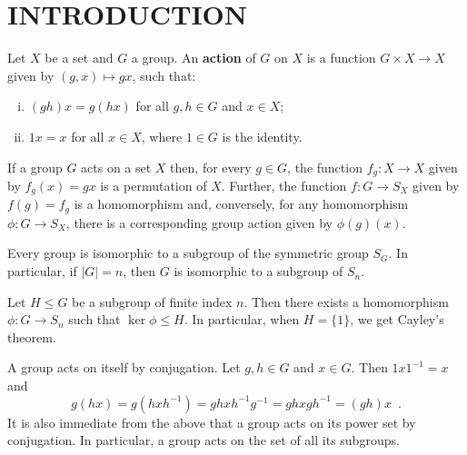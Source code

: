 \chapter{INTRODUCTION}

\begin{definition} \cite[99]{Rotman1967} Let $X$ be a set and $G$ a group. An \textbf{action} of $G$ on $X$ is a function $G \times X \to X$ given by $(g, x) \mapsto gx$, such that:
\begin{enumerate}[i.]
\item $(gh)x = g(hx)$ for all $g, h \in G$ and $x \in X$;
\item $1x = x$ for all $x \in X$, where $1 \in G$ is the identity.
\end{enumerate}
\end{definition}

\begin{proposition} \cite[99]{Rotman1967} If a group $G$ acts on a set $X$ then, for every $g \in G$, the function $f_g : X \to X$ given by $f_g(x) = gx$ is a permutation of $X$. Further, the function $f : G \to S_X$ given by $f(g) = f_g$ is a homomorphism and, conversely, for any homomorphism $\phi : G \to S_X$, there is a corresponding group action given by $\phi(g)(x)$.
\end{proposition}

\begin{theorem}[Cayley] \cite[96]{Rotman1967} Every group is isomorphic to a subgroup of the symmetric group $S_G$. In particular, if $|G| = n$, then $G$ is isomorphic to a subgroup of $S_n$.
\end{theorem}

\begin{theorem} \cite[97]{Rotman1967} Let $H \leq G$ be a subgroup of finite index $n$. Then there exists a homomorphism $\phi : G \to S_n$ such that $\ker \phi \leq H$. In particular, when $H = \{ 1 \}$, we get Cayley's theorem.
\end{theorem}

\begin{example} \cite[122]{DummitFoote2004} A group acts on itself by conjugation. Let $g, h \in G$ and $x \in G$. Then $1 x 1^{-1} = x$ and
$$
g(hx) = g(h x h^{-1}) = gh x h^{-1}g^{-1} = gh x gh^{-1} = (gh)x \enspace.
$$
It is also immediate from the above that a group acts on its power set by conjugation. In particular, a group acts on the set of all its subgroups.
\end{example}

